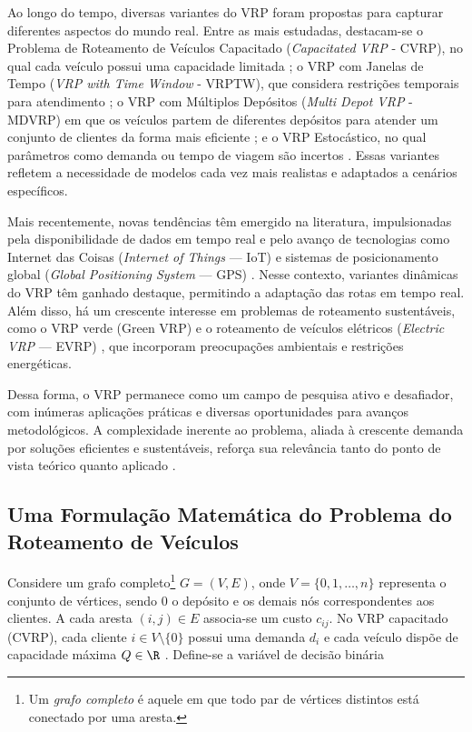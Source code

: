 Ao longo do tempo, diversas variantes do VRP foram propostas para capturar diferentes aspectos do mundo real. Entre as mais estudadas, destacam-se o Problema de Roteamento de Veículos Capacitado (\textit{Capacitated VRP} - CVRP), no qual cada veículo possui uma capacidade limitada  \cite{solomon1987algorithms, xiao2012development}; o VRP com Janelas de Tempo (\textit{VRP with Time Window} - VRPTW), que considera restrições temporais para atendimento \cite{christofides1979vehicle, gambardella1999macs}; o VRP com Múltiplos Depósitos (\textit{Multi Depot VRP} - MDVRP) em que os veículos partem de diferentes depósitos para atender um conjunto de clientes da forma mais eficiente \cite{alinaghian2018multi}; e o VRP Estocástico, no qual parâmetros como demanda ou tempo de viagem são incertos \cite{renaud1996tabu, gendreau1996stochastic}. Essas variantes refletem a necessidade de modelos cada vez mais realistas e adaptados a cenários específicos.

Mais recentemente, novas tendências têm emergido na literatura, impulsionadas pela disponibilidade de dados em tempo real e pelo avanço de tecnologias como Internet das Coisas (\textit{Internet of Things} --- IoT) e sistemas de posicionamento global (\textit{Global Positioning System} --- GPS) \cite{ritzinger2016survey, boysen2018scheduling}. Nesse contexto, variantes dinâmicas do VRP têm ganhado destaque, permitindo a adaptação das rotas em tempo real. Além disso, há um crescente interesse em problemas de roteamento sustentáveis, como o VRP verde (Green VRP) \cite{lin2014survey} e o roteamento de veículos elétricos (\textit{Electric VRP} --- EVRP) \cite{schiffer2017electric}, que incorporam preocupações ambientais e restrições energéticas.

Dessa forma, o VRP permanece como um campo de pesquisa ativo e desafiador, com inúmeras aplicações práticas e diversas oportunidades para avanços metodológicos. A complexidade inerente ao problema, aliada à crescente demanda por soluções eficientes e sustentáveis, reforça sua relevância tanto do ponto de vista teórico quanto aplicado \cite{braekers2016vehicle, moghdani2021green}.

\subsection{Uma Formulação Matemática do Problema do Roteamento de Veículos}


Considere um grafo completo\footnote{Um \textit{grafo completo} é aquele em que todo par de vértices distintos está conectado por uma aresta.} $G = (V, E)$, onde $V = \{0, 1, \dots, n\}$ representa o conjunto de vértices, sendo $0$ o depósito e os demais nós correspondentes aos clientes. A cada aresta $(i,j) \in E$ associa-se um custo $c_{ij}$. No VRP capacitado (CVRP), cada cliente $i \in V \setminus \{0\}$ possui uma demanda $d_i$ e cada veículo dispõe de capacidade máxima $Q\in\R$ \cite{huang_solving_nodate}. Define-se a variável de decisão binária

